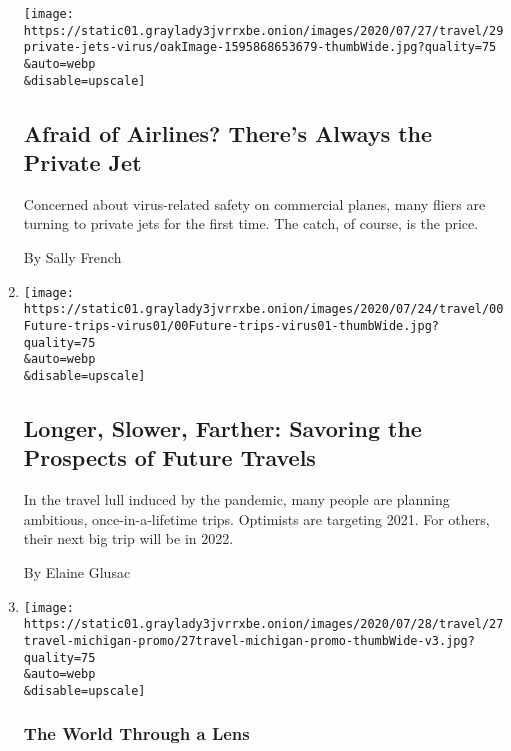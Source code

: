 \begin{enumerate}
  \texttt{[image: https://static01.graylady3jvrrxbe.onion/images/2020/07/27/travel/29private-jets-virus/oakImage-1595868653679-thumbWide.jpg?quality=75\\\&auto=webp\\\&disable=upscale]}

  \hypertarget{afraid-of-airlines-theres-always-the-private-jet}{%
  \subsection{Afraid of Airlines? There's Always the Private
  Jet}\label{afraid-of-airlines-theres-always-the-private-jet}}

  Concerned about virus-related safety on commercial planes, many fliers
  are turning to private jets for the first time. The catch, of course,
  is the price.

  By Sally French
\item
  \href{/2020/07/28/travel/future-travel-bucket-list-coronavirus.html}{}

  \texttt{[image: https://static01.graylady3jvrrxbe.onion/images/2020/07/24/travel/00Future-trips-virus01/00Future-trips-virus01-thumbWide.jpg?quality=75\\\&auto=webp\\\&disable=upscale]}

  \hypertarget{longer-slower-farther-savoring-the-prospects-of-future-travels}{%
  \subsection{Longer, Slower, Farther: Savoring the Prospects of Future
  Travels}\label{longer-slower-farther-savoring-the-prospects-of-future-travels}}

  In the travel lull induced by the pandemic, many people are planning
  ambitious, once-in-a-lifetime trips. Optimists are targeting 2021. For
  others, their next big trip will be in 2022.

  By Elaine Glusac
\item
  \href{/2020/07/27/travel/moose-michigan-isle-royale.html}{}

  \texttt{[image: https://static01.graylady3jvrrxbe.onion/images/2020/07/28/travel/27travel-michigan-promo/27travel-michigan-promo-thumbWide-v3.jpg?quality=75\\\&auto=webp\\\&disable=upscale]}

  \hypertarget{the-world-through-a-lens-1}{%
  \subsubsection{The World Through a
  Lens}\label{the-world-through-a-lens-1}}


\end{enumerate}
